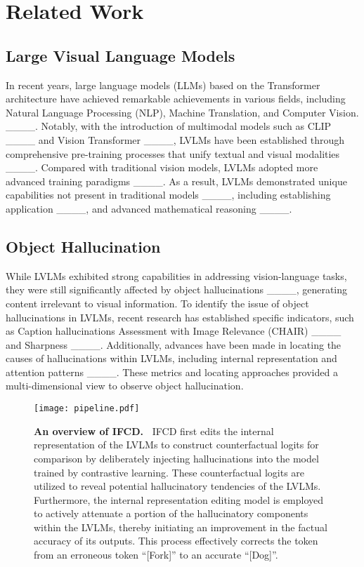 \section{Related Work}
\subsection{Large Visual Language Models}
In recent years, large language models (LLMs) based on the Transformer architecture have achieved remarkable achievements in various fields, including Natural Language Processing (NLP), Machine Translation, and Computer Vision. ____. Notably, with the introduction of multimodal models such as CLIP ____ and Vision Transformer ____, LVLMs have been established through comprehensive pre-training processes that unify textual and visual modalities ____. Compared with traditional vision models, LVLMs adopted more advanced training paradigms ____. As a result, LVLMs demonstrated unique capabilities not present in traditional models ____, including establishing application ____, and advanced mathematical reasoning ____.

\subsection{Object Hallucination}
While LVLMs exhibited strong capabilities in addressing vision-language tasks, they were still significantly affected by object hallucinations ____, generating content irrelevant to visual information. To identify the issue of object hallucinations in LVLMs, recent research has established specific indicators, such as Caption hallucinations Assessment with Image Relevance (CHAIR) ____ and Sharpness ____. Additionally, advances have been made in locating the causes of hallucinations within LVLMs, including internal representation and attention patterns ____. These metrics and locating approaches provided a multi-dimensional view to observe object hallucination. 

\begin{figure*}[ht!]
\vskip 0.2in
\begin{center}
\centerline{\texttt{[image: pipeline.pdf]}}
\caption{\textbf{An overview of IFCD.~} IFCD first edits the internal representation of the LVLMs to construct counterfactual logits for comparison by deliberately injecting hallucinations into the model trained by contrastive learning. These counterfactual logits are utilized to reveal potential hallucinatory tendencies of the LVLMs. Furthermore, the internal representation editing model is employed to actively attenuate a portion of the hallucinatory components within the LVLMs, thereby initiating an improvement in the factual accuracy of its outputs. This process effectively corrects the token from an erroneous token ``[Fork]'' to an accurate ``[Dog]''.}
\label{fig:pipe_line}
\vskip -0.3in
\end{center}
\end{figure*}

